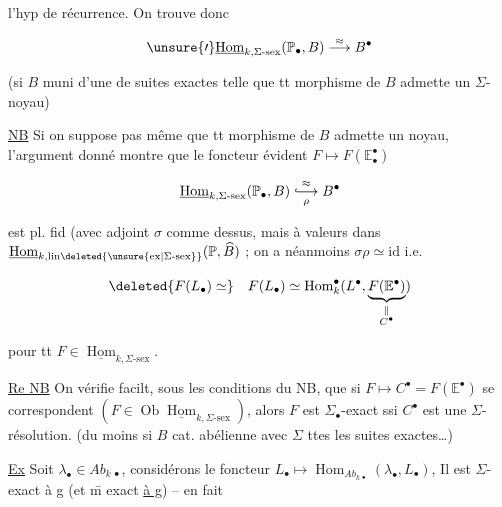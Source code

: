 
l'hyp de récurrence. On trouve donc

\[
 \unsure{\prime}\underline{\operatorname{Hom}}_{k,\Sigma\text{-}\mathrm{sex}}(\mathbb P_{\bullet},B)\overset{\approx}{\longrightarrow} B^{\bullet}
\]

(si $B$ muni d'une   de suites exactes telle que tt morphisme de $B$ admette un $\Sigma$-noyau)

\uline{NB} Si on  suppose  pas même que tt morphisme de $B$ admette un noyau, l'argument donné montre  que le foncteur évident $F\longmapsto F(\mathbb E_{\bullet}^{\bullet})$

\[
 \underline{\operatorname{Hom}}_{k,\Sigma\text{-}\mathrm{sex}}(\mathbb P_{\bullet},B)\underset{\rho}{\overset{\approx}{\lhook\joinrel\longrightarrow}}B^{\bullet}
\]

est pl. fid (avec adjoint $\sigma$ comme dessus, mais à valeurs dans $\underline{\operatorname{Hom}}_{k,\mathrm{lin}\deleted{\unsure{\mathrm{ex}|\Sigma\text{-}\mathrm{sex}}}}(\mathbb P,\widehat B)$ ; on a néanmoins $\sigma\rho\simeq\mathrm{id}$ i.e.

\[
 \deleted{F(L_{\bullet})\simeq}\quad F(L_{\bullet})\simeq\operatorname{Hom}^{\bullet}_{k}(L^{\bullet},\underbrace{F(\mathbb E^{\bullet})}_{\substack{\Vert\\C^{\bullet}}})
\]

pour tt $F\in\underline{\operatorname{Hom}}_{k,\Sigma\text{-}\mathrm{sex}}$.

\uline{Re NB} On  vérifie facilt, sous les conditions du NB, que si $F\longmapsto C^{\bullet}=F(\mathbb E^{\bullet})$ se correspondent $(F\in\operatorname{Ob}\underline{\operatorname{Hom}}_{k,\Sigma\text{-}\mathrm{sex}})$, alors $F$ est $\Sigma_{\bullet}$-exact ssi $C^{\bullet}$ est une $\Sigma$-résolution. (du moins si $B$ cat. abélienne avec $\Sigma$ ttes les suites exactes…)

\uline{Ex} Soit $\lambda_{\bullet}\in Ab_{k\,\bullet}$, considérons le foncteur $L_{\bullet}\longmapsto\operatorname{Hom}_{Ab_{k\,\bullet}}(\lambda_{\bullet},L_{\bullet})$,  Il est $\Sigma$-exact à g (et \={m} exact \uline{à g}) -- en fait


